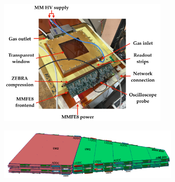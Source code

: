 \begin{figure}[!htb]
    \begin{center}
        \includegraphics[width=0.75\textwidth]{figures/nsw/frontend/mmfe8_t2_labelledPDF}
        \caption{
        }
        \label{fig:mmfe8_t2}
    \end{center}
\end{figure}

\begin{figure}[!htb]
    \begin{center}
        \includegraphics[width=0.8\textwidth]{figures/nsw/frontend/mm_quad_elx}
        \caption{
            {\color{red}{Explain how the frontend boards are situated on the NSW chambers}}
        }
        \label{fig:mm_quad_elx}
    \end{center}
\end{figure}
